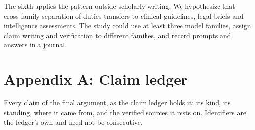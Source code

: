 \documentclass[
]{article}
\begin{document}
The sixth applies the pattern outside scholarly writing. We hypothesize
that cross-family separation of duties transfers to clinical guidelines,
legal briefs and intelligence assessments. The study could use at least
three model families, assign claim writing and verification to different
families, and record prompts and answers in a journal.

\section*{Appendix A: Claim ledger}\label{appendix-a-claim-ledger}

Every claim of the final argument, as the claim ledger holds it: its
kind, its standing, where it came from, and the verified sources it
rests on. Identifiers are the ledger's own and need not be consecutive.
\end{document}

